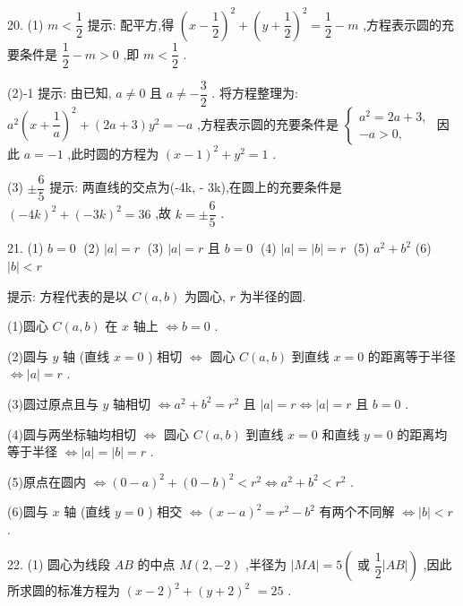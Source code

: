 20. (1) $m < \dfrac{1}{2}$ 提示: 配平方,得 ${\left( x - \dfrac{1}{2}\right) }^{2} + {\left( y + \dfrac{1}{2}\right) }^{2} = \dfrac{1}{2} - m$ ,方程表示圆的充要条件是 $\dfrac{1}{2} - m > 0$ ,即 $m < \dfrac{1}{2}$ .

(2)-1 提示: 由已知, $a \neq  0$ 且 $a \neq   - \dfrac{3}{2}$ . 将方程整理为: ${a}^{2}{\left( x + \dfrac{1}{a}\right) }^{2} + \left( {{2a} + 3}\right) {y}^{2} =  - a$ ,方程表示圆的充要条件是 $\left\{  \begin{array}{l} {a}^{2} = {2a} + 3, \\   - a > 0, \end{array}\right.$ 因此 $a =  - 1$ ,此时圆的方程为 ${\left( x - 1\right) }^{2} + {y}^{2} = 1$ .

(3) $\pm  \dfrac{6}{5}$ 提示: 两直线的交点为(-4k, - 3k),在圆上的充要条件是 ${\left( -{4k}\right) }^{2} + {\left( -{3k}\right) }^{2} = {36}$ ,故 $k =  \pm  \dfrac{6}{5}$ .

21. (1) $b = 0\;$ (2) $\left| a\right|  = r\;$ (3) $\left| a\right|  = r$ 且 $b = 0\;$ (4) $\left| a\right|  = \left| b\right|  = r\;$ (5) ${a}^{2} + {b}^{2}$ (6) $\left| b\right|  < r$

提示: 方程代表的是以 $C\left( {a,b}\right)$ 为圆心, $r$ 为半径的圆.

(1)圆心 $C\left( {a,b}\right)$ 在 $x$ 轴上 $\Leftrightarrow  b = 0$ .

(2)圆与 $y$ 轴 (直线 $x = 0$ ) 相切 $\Leftrightarrow$ 圆心 $C\left( {a,b}\right)$ 到直线 $x = 0$ 的距离等于半径 $\Leftrightarrow  \left| a\right|  = r$ .

(3)圆过原点且与 $y$ 轴相切 $\Leftrightarrow  {a}^{2} + {b}^{2} = {r}^{2}$ 且 $\left| a\right|  = r \Leftrightarrow  \left| a\right|  = r$ 且 $b = 0$ .

(4)圆与两坐标轴均相切 $\Leftrightarrow$ 圆心 $C\left( {a,b}\right)$ 到直线 $x = 0$ 和直线 $y = 0$ 的距离均等于半径 $\Leftrightarrow  \left| a\right|  = \left| b\right|  = r$ .

(5)原点在圆内 $\Leftrightarrow  {\left( 0 - a\right) }^{2} + {\left( 0 - b\right) }^{2} < {r}^{2} \Leftrightarrow  {a}^{2} + {b}^{2} < {r}^{2}$ .

(6)圆与 $x$ 轴 (直线 $y = 0$ ) 相交 $\Leftrightarrow  {\left( x - a\right) }^{2} = {r}^{2} - {b}^{2}$ 有两个不同解 $\Leftrightarrow  \left| b\right|  < r$ .

22. (1) 圆心为线段 ${AB}$ 的中点 $M\left( {2, - 2}\right)$ ,半径为 $\left| {MA}\right|  = 5\left( {\text{ 或 }\dfrac{1}{2}\left| {AB}\right| }\right)$ ,因此所求圆的标准方程为 ${\left( x - 2\right) }^{2} + {\left( y + 2\right) }^{2}$  $= {25}$ .


